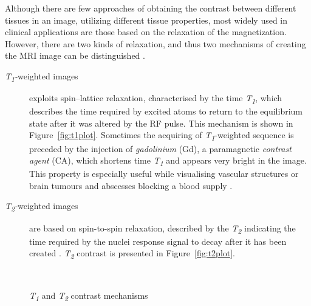 Although there are few approaches of obtaining the contrast between different tissues in an image, utilizing different tissue properties, most widely used in clinical applications are those based on the relaxation of the magnetization. However, there are two kinds of relaxation, and thus two mechanisms of creating the MRI image can be distinguished \cite{biomedical_hanbook_imaging}.
\begin{description}
		\item [\textit{T\textsubscript{1}-}weighted images] exploits spin–lattice relaxation, characterised by the time \textit{T\textsubscript{1}}, which describes the time required by excited atoms to return to the equilibrium state after it was altered by the RF pulse. This mechanism is shown in Figure~\ref{fig:t1plot}. Sometimes the acquiring of \textit{T\textsubscript{1}}-weighted sequence is preceded by the injection of \textit{gadolinium} (Gd), a paramagnetic \textit{contrast agent} (CA), which  shortens time \textit{T\textsubscript{1}} and appears very bright in the image. This property is especially useful while visualising vascular structures or brain tumours and abscesses blocking a blood supply \cite{biomedical_hanbook_imaging, grover2015magnetic}.   
		
		\item [\textit{T\textsubscript{2}-}weighted images] are based on spin-to-spin relaxation, described by the \textit{T\textsubscript{2}} indicating the time required by the nuclei response signal to decay after it has been created \cite{biomedical_hanbook_imaging, grover2015magnetic}. \textit{T\textsubscript{2}} contrast is presented in Figure~\ref{fig:t2plot}. 
\end{description}
\begin{figure}[H]
\captionsetup[subfloat]{captionskip=0.5cm}
	\centering
	\hspace{1.5cm}
	\\	
\vspace{0.5cm}
\caption[\textit{T\textsubscript{1}} and \textit{T\textsubscript{2}} contrast mechanisms]{\textit{T\textsubscript{1}} and \textit{T\textsubscript{2}} contrast mechanisms \cite{biomedical_hanbook_imaging}}
\label{fig:t1t2plot}
\end{figure}

